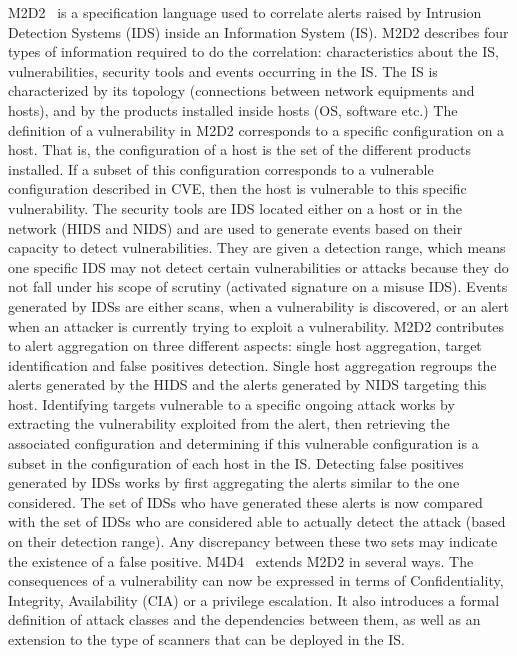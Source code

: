 M2D2~\cite{M2D2-Morin2002} is a specification language used to correlate alerts raised by Intrusion Detection Systems (IDS) inside an Information System (IS).
M2D2 describes four types of information required to do the correlation: characteristics about the IS, vulnerabilities, security tools and events occurring in the IS.
The IS is characterized by its topology (connections between network equipments and hosts), and by the products installed inside hosts (\eg OS, software etc.)
The definition of a vulnerability in M2D2 corresponds to a specific configuration on a host.
That is, the configuration of a host is the set of the different products installed.
If a subset of this configuration corresponds to a vulnerable configuration described in CVE, then the host is vulnerable to this specific vulnerability.
The security tools are IDS located either on a host or in the network (HIDS and NIDS) and are used to generate events based on their capacity to detect vulnerabilities.
They are given a detection range, which means one specific IDS may not detect certain vulnerabilities or attacks because they do not fall under his scope of scrutiny (\eg activated signature on a misuse IDS).
Events generated by IDSs are either scans, when a vulnerability is discovered, or an alert when an attacker is currently trying to exploit a vulnerability.
M2D2 contributes to alert aggregation on three different aspects: single host aggregation, target identification and false positives detection.
Single host aggregation regroups the alerts generated by the HIDS and the alerts generated by NIDS targeting this host.
Identifying targets vulnerable to a specific ongoing attack works by extracting the vulnerability exploited from the alert, then retrieving the associated configuration and determining if this vulnerable configuration is a subset in the configuration of each host in the IS.
Detecting false positives generated by IDSs works by first aggregating the alerts similar to the one considered.
The set of IDSs who have generated these alerts is now compared with the set of IDSs who are considered able to actually detect the attack (based on their detection range).
Any discrepancy between these two sets may indicate the existence of a false positive.
M4D4~\cite{M4D4-Morin2008} extends M2D2 in several ways. The consequences of a vulnerability can now be expressed in terms of Confidentiality, Integrity, Availability (CIA) or a privilege escalation.
It also introduces a formal definition of attack classes and the dependencies between them, as well as an extension to the type of scanners that can be deployed in the IS.


